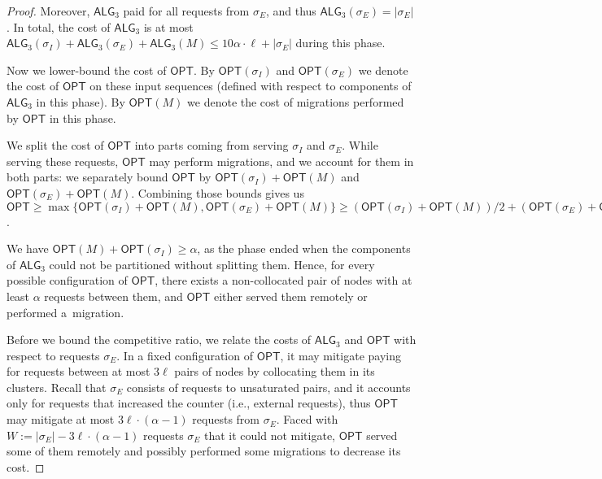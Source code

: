 \documentclass[manuscript,screen=true]{acmart}
\newcommand{\OPT}{\textsf{OPT}\xspace}
\newcommand{\TAlg}{{\ensuremath{\textsf{ALG}_{3}}}\xspace} %
\newcommand\maciek[1]{\color{brown}\textbf{\\ Maciek: #1}\color{black}}
\begin{document}
\begin{proof}

  Moreover, \TAlg paid for all requests from $\sigma_E$, and thus $\TAlg(\sigma_E) = |\sigma_E|$.
  In total, the cost of \TAlg is at most $\TAlg(\sigma_I) + \TAlg(\sigma_E) + \TAlg(M) \leq 10\alpha\cdot \ell + |\sigma_E|$ during this phase.

  \medskip

  Now we lower-bound the cost of $\OPT$.
  By $\OPT(\sigma_I)$ and $\OPT(\sigma_E)$ we denote the cost of $\OPT$ on these input sequences (defined with respect to components of \TAlg in this phase).
  By $\OPT(M)$ we denote the cost of migrations performed by $\OPT$ in this phase.
  
  We split the cost of $\OPT$ into parts coming from serving $\sigma_I$ and $\sigma_E$.
  While serving these requests, $\OPT$ may perform migrations, and we account for them in both parts: we separately bound $\OPT$ by $\OPT(\sigma_I) + \OPT(M)$ and $\OPT(\sigma_E) + \OPT(M)$.
  Combining those bounds gives us $\OPT \geq \max\{\OPT(\sigma_I) + \OPT(M), \OPT(\sigma_E) + \OPT(M)\} \geq (\OPT(\sigma_I) + \OPT(M)) / 2 + (\OPT(\sigma_E) + \OPT(M)) / 2$.


  We have $\OPT(M) + \OPT(\sigma_I) \geq \alpha$, as the phase ended when the components of \TAlg{} could not be partitioned without splitting them.
  Hence, for every possible configuration of $\OPT$, there exists a non-collocated pair of nodes with at least $\alpha$ requests between them, and
  $\OPT$ either served them remotely or performed a~migration.

  \medskip
  Before we bound the competitive ratio, we relate the costs of $\TAlg$ and $\OPT$ with respect to requests $\sigma_E$.
  In a fixed configuration of $\OPT$, it may mitigate paying for requests between at most $3\ell$ pairs of nodes by collocating them in its clusters.
  Recall that $\sigma_E$ consists of requests to unsaturated pairs, and it accounts only for requests that increased the counter (i.e., external requests), thus $\OPT$ may mitigate at most $3\ell\cdot(\alpha - 1)$ requests from $\sigma_E$.
  Faced with $W := |\sigma_E| - 3\ell\cdot(\alpha-1)$ requests $\sigma_E$ that it could not mitigate, $\OPT$ served some of them remotely and possibly performed some migrations to decrease its cost.



\end{proof}
\end{document}
